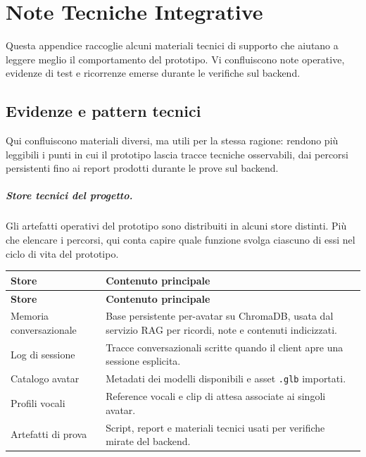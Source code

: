 \chapter{Note Tecniche Integrative}
\label{app:notes}

Questa appendice raccoglie alcuni materiali tecnici di supporto che aiutano a leggere meglio il comportamento del prototipo. Vi confluiscono note operative, evidenze di test e ricorrenze emerse durante le verifiche sul backend.

\section{Evidenze e pattern tecnici}
Qui confluiscono materiali diversi, ma utili per la stessa ragione: rendono più leggibili i punti in cui il prototipo lascia tracce tecniche osservabili, dai percorsi persistenti fino ai report prodotti durante le prove sul backend.

\paragraph{Store tecnici del progetto.}
Gli artefatti operativi del prototipo sono distribuiti in alcuni store distinti. Più che elencare i percorsi, qui conta capire quale funzione svolga ciascuno di essi nel ciclo di vita del prototipo.

\par\begingroup
\small
\setlength{\LTleft}{0pt}
\setlength{\LTright}{0pt}
\captionsetup{type=table}
\label{tab:appendix-notes-paths}
\begin{longtable}{|>{\raggedright\arraybackslash}p{}|>{\raggedright\arraybackslash}p{}|}
\hline
\textbf{Store} & \textbf{Contenuto principale} \\
\hline
\endfirsthead
\hline
\textbf{Store} & \textbf{Contenuto principale} \\
\hline
\endhead
Memoria conversazionale & Base persistente per-avatar su ChromaDB, usata dal servizio RAG per ricordi, note e contenuti indicizzati. \\
\hline
Log di sessione & Tracce conversazionali scritte quando il client apre una sessione esplicita. \\
\hline
Catalogo avatar & Metadati dei modelli disponibili e asset \texttt{.glb} importati. \\
\hline
Profili vocali & Reference vocali e clip di attesa associate ai singoli avatar. \\
\hline
Artefatti di prova & Script, report e materiali tecnici usati per verifiche mirate del backend. \\
\hline
\end{longtable}
\par\endgroup

